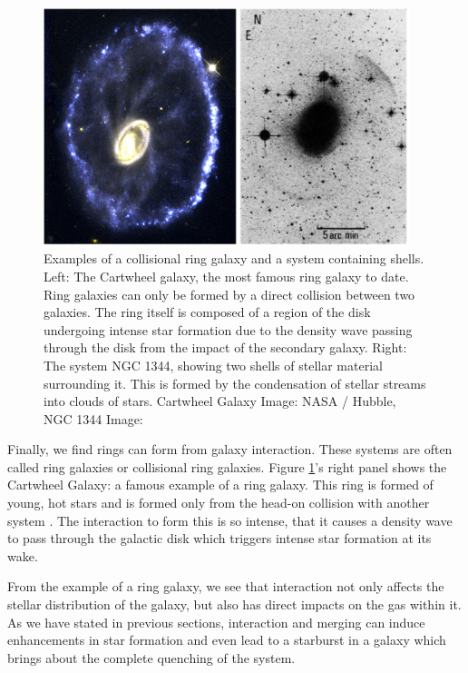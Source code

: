 \begin{figure}
\centering
\includegraphics[width=0.95\textwidth]{Introduction/figures/shells-rings.jpg}
\caption[Examples of a collisional ring galaxy and a system containing shells.]{Examples of a collisional ring galaxy and a system containing shells. Left: The Cartwheel galaxy, the most famous ring galaxy to date. Ring galaxies can only be formed by a direct collision between two galaxies. The ring itself is composed of a region of the disk undergoing intense star formation due to the density wave passing through the disk from the impact of the secondary galaxy. Right: The system NGC 1344, showing two shells of stellar material surrounding it. This is formed by the condensation of stellar streams into clouds of stars. Cartwheel Galaxy Image: NASA / Hubble, NGC 1344 Image: \citet{1983ApJ...274..534M}}
\label{fig:tidal-features-ex}
\end{figure}

Finally, we find rings can form from galaxy interaction. These systems are often called ring galaxies or collisional ring galaxies. Figure \ref{fig:tidal-features-ex}'s right panel shows the Cartwheel Galaxy: a famous example of a ring galaxy. This ring is formed of young, hot stars and is formed only from the head-on collision with another system \citep{1976ApJ...209..382L}. The interaction to form this is so intense, that it causes a density wave to pass through the galactic disk which triggers intense star formation at its wake.

From the example of a ring galaxy, we see that interaction not only affects the stellar distribution of the galaxy, but also has direct impacts on the gas within it. As we have stated in previous sections, interaction and merging can induce enhancements in star formation and even lead to a starburst in a galaxy which brings about the complete quenching of the system.

